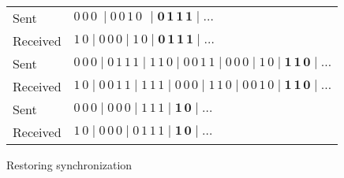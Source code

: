 \documentclass{irmaart}
\theoremstyle{plain}
\begin{document}
\begin{figure}[h]
\begin{center}
\begin{tabular}{ll}
Sent & $0\,0\,0\ \mid 0\,0\,1\,0\,\ \mid\mathbf{0\,1\,1\,1\mid\dots}$\\
\mathstrut Received & $1\,0\mid 0\,0\,0 \mid 1\,0 \mid\mathbf{0\,1\,1\,1\mid\dots}$\\
\hline
\mathstrut Sent & $0\,0\,0\mid 0\,1\,1\,1 \mid 1\,1\,0\mid 0\,0\,1\,1 \mid 0\,0\,0 \mid 1\,0 \mid\mathbf{1\,1\,0\mid \dots}$\\
\mathstrut Received & $1\,0\mid 0\,0\,1\,1 \mid 1\,1\,1 \mid 0\,0\,0\mid 1\,1\,0 \mid 0\,0\,1\,0 \mid\mathbf{1\,1\,0\mid \dots}$\\
\hline
\mathstrut Sent & $0\,0\,0\mid 0\,0\,0 \mid 1\,1\,1\mid\mathbf{1\,0\mid \dots}$\\
\mathstrut Received & $1\,0\mid 0\,0\,0 \mid 0\,1\,1\,1 \mid\mathbf{1\,0\mid \dots}$
\end{tabular}
\caption{Restoring synchronization}\label{KV:fig:decoding}
\end{center}
\end{figure}
\end{document}
